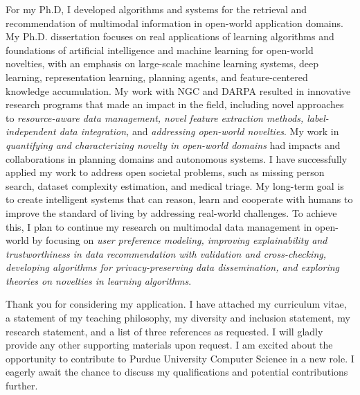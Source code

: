\documentclass[10pt]{article}
\renewcommand*\paragraph[1]{}
\begin{document}
\paragraph{1 and P1) Earned doctoral degree in computer science or a closely related field}
For my Ph.D, I developed algorithms and systems for the retrieval and recommendation of multimodal information in open-world application domains. My Ph.D. dissertation focuses on real applications of learning algorithms and foundations of artificial intelligence and machine learning for open-world novelties, with an emphasis on large-scale machine learning systems, deep learning, representation learning, planning agents, and feature-centered knowledge accumulation. My work with NGC and DARPA resulted in innovative research programs that made an impact in the field, including novel approaches to \textit{resource-aware data management, novel feature extraction methods, label-independent data integration,} and \textit{addressing open-world novelties}. My work in \textit{quantifying and characterizing novelty in open-world domains} had impacts and collaborations in planning domains and autonomous systems. I have successfully applied my work to address open societal problems, such as missing person search, dataset complexity estimation, and medical triage.
%
My long-term goal is to create intelligent systems that can reason, learn and cooperate with humans to improve the standard of living by 
addressing real-world challenges.
To achieve this, I plan to continue my research on multimodal data management in open-world by focusing on \textit{user preference modeling, improving explainability and trustworthiness in data recommendation with validation and cross-checking, developing algorithms for privacy-preserving data dissemination, and exploring theories on novelties in learning algorithms}. 
%


Thank you for considering my application. 
I have attached my curriculum vitae, a statement of my teaching philosophy, my diversity and inclusion statement, my research statement, and a list of three references as requested. I will gladly provide any other supporting materials upon request.
I am excited about the opportunity to contribute to Purdue University Computer Science in a new role. I eagerly await the chance to discuss my qualifications and potential contributions further.
\end{document}
